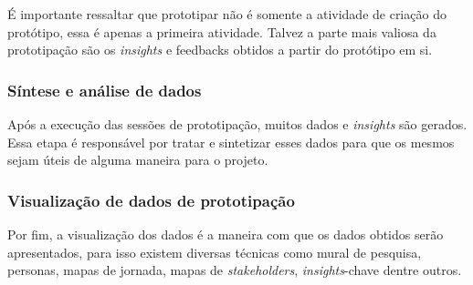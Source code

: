 É importante ressaltar que prototipar não é somente a atividade de criação do protótipo, essa é apenas a primeira atividade. Talvez a parte mais valiosa da prototipação são os \textit{insights} e feedbacks obtidos a partir do protótipo em si.

\subsubsection{Síntese e análise de dados}

Após a execução das sessões de prototipação, muitos dados e \textit{insights} são gerados. Essa etapa é responsável por tratar e sintetizar esses dados para que os mesmos sejam úteis de alguma maneira para o projeto.

\subsubsection{Visualização de dados de prototipação}

Por fim, a visualização dos dados é a maneira com que os dados obtidos serão apresentados, para isso existem diversas técnicas como mural de pesquisa, personas, mapas de jornada, mapas de \textit{stakeholders}, \textit{insights}-chave dentre outros.



